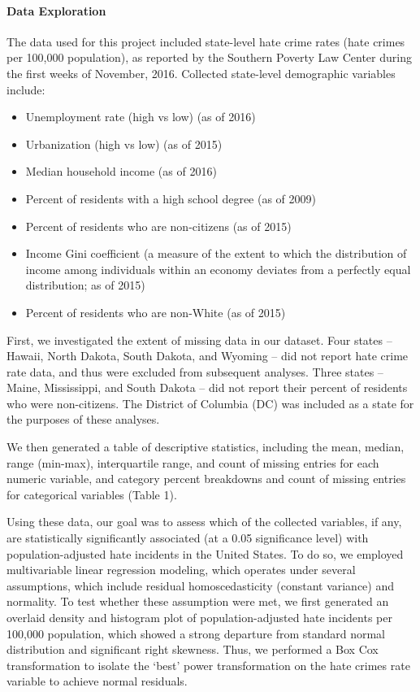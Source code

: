 \documentclass[
]{article}
\providecommand{\tightlist}{%
  \setlength{\itemsep}{0pt}\setlength{\parskip}{0pt}}
\begin{document}
\hypertarget{data-exploration}{%
\paragraph{Data Exploration}\label{data-exploration}}

The data used for this project included state-level hate crime rates
(hate crimes per 100,000 population), as reported by the Southern
Poverty Law Center during the first weeks of November, 2016. Collected
state-level demographic variables include:

\begin{itemize}
\tightlist
\item
  Unemployment rate (high vs low) (as of 2016)
\item
  Urbanization (high vs low) (as of 2015)
\item
  Median household income (as of 2016)
\item
  Percent of residents with a high school degree (as of 2009)
\item
  Percent of residents who are non-citizens (as of 2015)
\item
  Income Gini coefficient (a measure of the extent to which the
  distribution of income among individuals within an economy deviates
  from a perfectly equal distribution; as of 2015)
\item
  Percent of residents who are non-White (as of 2015)
\end{itemize}

First, we investigated the extent of missing data in our dataset. Four
states -- Hawaii, North Dakota, South Dakota, and Wyoming -- did not
report hate crime rate data, and thus were excluded from subsequent
analyses. Three states -- Maine, Mississippi, and South Dakota -- did
not report their percent of residents who were non-citizens. The
District of Columbia (DC) was included as a state for the purposes of
these analyses.

We then generated a table of descriptive statistics, including the mean,
median, range (min-max), interquartile range, and count of missing
entries for each numeric variable, and category percent breakdowns and
count of missing entries for categorical variables (Table 1).

Using these data, our goal was to assess which of the collected
variables, if any, are statistically significantly associated (at a 0.05
significance level) with population-adjusted hate incidents in the
United States. To do so, we employed multivariable linear regression
modeling, which operates under several assumptions, which include
residual homoscedasticity (constant variance) and normality. To test
whether these assumption were met, we first generated an overlaid
density and histogram plot of population-adjusted hate incidents per
100,000 population, which showed a strong departure from standard normal
distribution and significant right skewness. Thus, we performed a Box
Cox transformation to isolate the `best' power transformation on the
hate crimes rate variable to achieve normal residuals.
\end{document}
